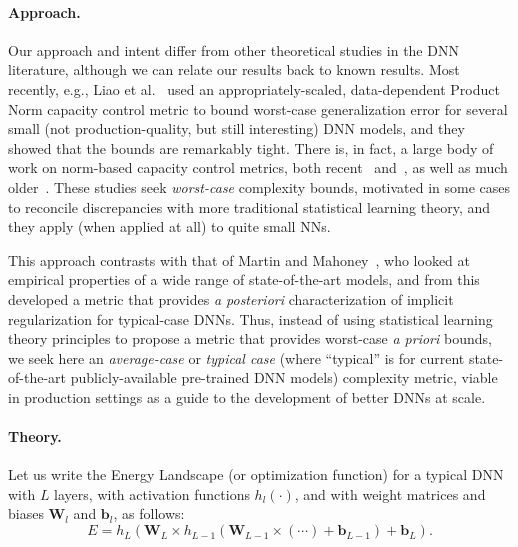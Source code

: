 \paragraph{Approach.} 
Our approach and intent differ from other theoretical studies in the DNN literature, although we can relate our results back to known results.
Most recently, e.g., Liao et al.~\cite{LMBx18_TR} used an appropriately-scaled, data-dependent Product Norm capacity control metric to bound worst-case generalization error for several small (not production-quality, but still interesting) DNN models, and they showed that the bounds are remarkably tight.
There is, in fact, a large body of work on norm-based capacity control metrics, both recent~\cite{LMBx18_TR, SHNx17_TR,PLMx18_TR} and~\cite{NTS14_TR,NTS15,NBMS17_TR,BFT17_TR,YM17_TR,KKB17_TR,NBS17_TR,AGNZ18_TR,ACH18_TR,ZF18_TR}, as well as much older~\cite{Bar97,MN09_TR}. 
These studies seek \emph{worst-case} complexity bounds, motivated in some cases to reconcile discrepancies with more traditional statistical learning theory, and they apply (when applied at all) to quite small NNs.

This approach contrasts with that of Martin and Mahoney~\cite{MM18_TR,MM19_HTSR_ICML}, who looked at empirical properties of a wide range of state-of-the-art models, and from this developed a metric that provides \emph{a posteriori} characterization of implicit regularization for typical-case DNNs.  
Thus, instead of using statistical learning theory principles to propose a metric that provides worst-case \emph{a priori} bounds, we seek here an \emph{average-case} or \emph{typical case} (where ``typical'' is for current state-of-the-art publicly-available pre-trained DNN models) complexity metric, viable in production settings as a guide to the development of better DNNs at scale.

\paragraph{Theory.} 
Let us write the Energy Landscape (or optimization function) for a typical DNN with $L$ layers, with activation functions $h_{l}(\cdot)$, and with weight matrices and 
biases $\mathbf{W}_{l}$ and $\mathbf{b}_{l}$, as follows: 
\begin{equation}
E=h_{L}(\mathbf{W}_{L}\times h_{L-1}(\mathbf{W}_{L-1}\times(\cdots)+\mathbf{b}_{L-1})+\mathbf{b}_{L})  .
\label{eqn:dnn_energy}
\end{equation}

